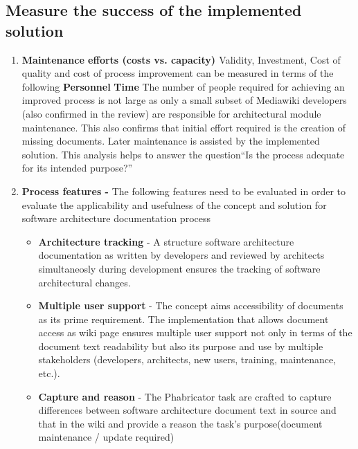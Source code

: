 \subsection{Measure the success of the implemented solution}
\begin{enumerate}
\item \textbf{Maintenance efforts (costs vs. capacity) \cite{Shahin2014}} 
Validity, Investment, Cost of quality and cost of process improvement can be measured in terms of the following \cite{Gorschek2006}
\newline \indent \textbf{Personnel}
\newline \indent \textbf{Time}
\newline 
The number of people required for achieving an improved process is not large as only a small subset of Mediawiki developers (also confirmed in the review) are responsible for architectural module maintenance. This also confirms that initial effort required is the creation of missing documents. Later maintenance is assisted by the implemented solution.
\newline
This analysis helps to answer the question\enquote{Is the process adequate for its intended purpose?}
\item \textbf{Process features - }
The following features need to be evaluated in order to evaluate the applicability and usefulness  \cite{Fuggeffa1988} of the concept and solution for software architecture documentation process
\begin{itemize}
\item \textbf{Architecture tracking} - A structure software architecture documentation as written by developers and reviewed by architects simultaneosly during development ensures the tracking of software architectural changes.
\item \textbf{Multiple user support} - The concept aims accessibility of documents as its prime requirement. The implementation that allows document access as wiki page ensures multiple user support not only in terms of the document text readability but also   its purpose and use by multiple stakeholders (developers, architects, new users, training, maintenance, etc.).
\item \textbf{Capture and reason} - The Phabricator task are crafted to capture differences between software architecture document text in source and that in the wiki and provide a reason the task's purpose(document maintenance / update required)
\end{itemize}
\end{enumerate}

